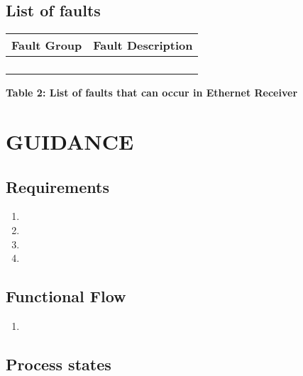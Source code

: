 \subsection{List of faults}
\begin{table}[h!]
	\begin{center}
		\begin{tabular}{|p{6 cm}|p{8 cm}|}
			\hline
			\textbf{Fault Group} & \textbf{Fault Description}\\
			\hline
			&   \\
			\hline
			&  \\
			\hline
			&  \\
			\hline
			&  \\
			\hline
			
		\end{tabular}
		\begin{center}
			\textbf{Table 2: List of faults that can occur in Ethernet Receiver}
		\end{center}
	\end{center}
\end{table}
\newpage

\section{GUIDANCE}
\subsection{Requirements}

\begin{enumerate}
	\item 
	\item 
	\item 
	\item 
	
\end{enumerate}

\subsection{Functional Flow}

\begin{enumerate}
	\item
	
\end{enumerate}

\subsection{Process states}

